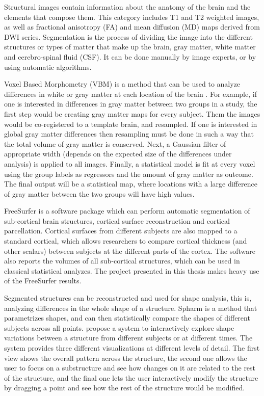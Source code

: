 Structural images contain information about the anatomy of the brain and the elements that compose them. This category includes T1 and T2 weighted images, as well as fractional anisotropy (FA) and mean diffusion (MD) maps derived from DWI series. Segmentation is the process of dividing the image into the different structures or types of matter that make up the brain, gray matter, white matter and cerebro-spinal fluid (CSF). It can be done manually by image experts, or by using automatic algorithms. 


Voxel Based Morphometry (VBM) is a method that can be used to analyze differences in white or gray matter at each location of the brain \autocite{friston_statistical_2007}. For example, if one is interested in differences in gray matter between two groups in a study, the first step would be creating gray matter maps for every subject. Them the images would be co-registered to a template brain, and resampled. If one is interested in global gray matter differences then resampling must be done in such a way that the total volume of gray matter is conserved. Next, a Gaussian filter of appropriate width (depends on the expected size of the differences under analysis) is applied to all images. Finally, a statistical model is fit at every voxel using the group labels as regressors and the amount of gray matter as outcome. The final output will be a statistical map, where locations with a large difference of gray matter between the two groups will have high values. 


FreeSurfer \autocite{dale_cortical_1999-1, fischl_whole_2002} is a software package which can perform automatic segmentation of sub-cortical brain structures, cortical surface reconstruction and cortical parcellation. Cortical surfaces from different subjects are also mapped to a standard cortical, which allows researchers to compare cortical thickness (and other scalars) between subjects at the different parts of the cortex. The software also reports the volumes of all sub-cortical structures, which can be used in classical statistical analyzes. The project presented in this thesis makes heavy use of the FreeSurfer results.

Segmented structures can be reconstructed and used for shape analysis, this is, analyzing differences in the whole shape of a structure. 
Spharm \autocite{gerig_shape_2001} is a method that parametrizes shapes, and can then statistically compare the shapes of different subjects across all points.  \autocite{hermann_visual_2014} propose a system to interactively explore shape variations between a structure from different subjects or at different times. The system provides three different visualizations at different levels of detail. The first view shows the overall pattern across the structure, the second one allows the user to focus on a substructure and see how changes on it are related to the rest of the structure, and the final one lets the user interactively modify the structure by dragging a  point and see how the rest of the structure would be modified. 

